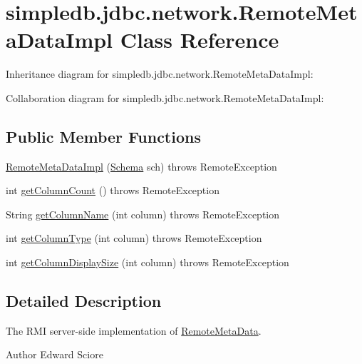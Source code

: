 \hypertarget{classsimpledb_1_1jdbc_1_1network_1_1RemoteMetaDataImpl}{}\section{simpledb.\+jdbc.\+network.\+Remote\+Meta\+Data\+Impl Class Reference}
\label{classsimpledb_1_1jdbc_1_1network_1_1RemoteMetaDataImpl}


Inheritance diagram for simpledb.\+jdbc.\+network.\+Remote\+Meta\+Data\+Impl\+:


Collaboration diagram for simpledb.\+jdbc.\+network.\+Remote\+Meta\+Data\+Impl\+:
\subsection*{Public Member Functions}
\begin{DoxyCompactItemize}
\item 
\hyperlink{classsimpledb_1_1jdbc_1_1network_1_1RemoteMetaDataImpl_a552ef2129f2c4be5a963d12a4db6fdb4}{Remote\+Meta\+Data\+Impl} (\hyperlink{classsimpledb_1_1record_1_1Schema}{Schema} sch)  throws Remote\+Exception 
\item 
int \hyperlink{classsimpledb_1_1jdbc_1_1network_1_1RemoteMetaDataImpl_ada92f0f38b9379024a59bcf50ea3c6c4}{get\+Column\+Count} ()  throws Remote\+Exception 
\item 
String \hyperlink{classsimpledb_1_1jdbc_1_1network_1_1RemoteMetaDataImpl_a94a385bd9190b10c3a865f17a53978d6}{get\+Column\+Name} (int column)  throws Remote\+Exception 
\item 
int \hyperlink{classsimpledb_1_1jdbc_1_1network_1_1RemoteMetaDataImpl_a9b478868603ba76bdb7ef16f7c483236}{get\+Column\+Type} (int column)  throws Remote\+Exception 
\item 
int \hyperlink{classsimpledb_1_1jdbc_1_1network_1_1RemoteMetaDataImpl_a0706aa74aa84aa1823062b6c7375d6c3}{get\+Column\+Display\+Size} (int column)  throws Remote\+Exception 
\end{DoxyCompactItemize}


\subsection{Detailed Description}
The R\+MI server-\/side implementation of \hyperlink{interfacesimpledb_1_1jdbc_1_1network_1_1RemoteMetaData}{Remote\+Meta\+Data}. \begin{DoxyAuthor}{Author}
Edward Sciore 
\end{DoxyAuthor}


